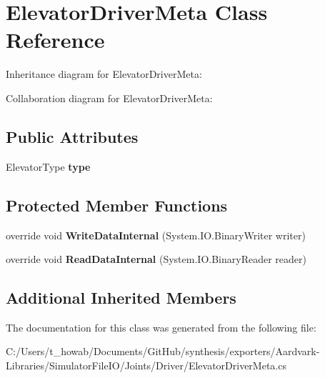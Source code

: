 \hypertarget{class_elevator_driver_meta}{}\section{Elevator\+Driver\+Meta Class Reference}
\label{class_elevator_driver_meta}


Inheritance diagram for Elevator\+Driver\+Meta\+:


Collaboration diagram for Elevator\+Driver\+Meta\+:
\subsection*{Public Attributes}
\begin{DoxyCompactItemize}
\item 
\mbox{\label{class_elevator_driver_meta_a3727ce3b4f7f46375448e76072dd3853}} 
Elevator\+Type {\bfseries type}
\end{DoxyCompactItemize}
\subsection*{Protected Member Functions}
\begin{DoxyCompactItemize}
\item 
\mbox{\label{class_elevator_driver_meta_a77718c76ce03bb5536ea0073f581cd26}} 
override void {\bfseries Write\+Data\+Internal} (System.\+I\+O.\+Binary\+Writer writer)
\item 
\mbox{\label{class_elevator_driver_meta_a05e88ef24e8ab8ed3e3c321af5bd7b62}} 
override void {\bfseries Read\+Data\+Internal} (System.\+I\+O.\+Binary\+Reader reader)
\end{DoxyCompactItemize}
\subsection*{Additional Inherited Members}


The documentation for this class was generated from the following file\+:\begin{DoxyCompactItemize}
\item 
C\+:/\+Users/t\+\_\+howab/\+Documents/\+Git\+Hub/synthesis/exporters/\+Aardvark-\/\+Libraries/\+Simulator\+File\+I\+O/\+Joints/\+Driver/Elevator\+Driver\+Meta.\+cs\end{DoxyCompactItemize}

